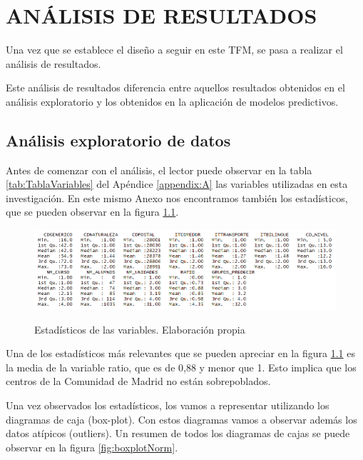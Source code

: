 \chapter{ANÁLISIS DE RESULTADOS}
Una vez que se establece el diseño a seguir en este TFM, se pasa a realizar el análisis de resultados.

Este análisis de resultados diferencia entre aquellos resultados obtenidos en el análisis exploratorio y los obtenidos en la aplicación de modelos predictivos.

\section{Análisis exploratorio de datos}

Antes de comenzar con el análisis, el lector puede observar en la tabla \ref{tab:TablaVariables} del Apéndice \ref{appendix:A} las variables utilizadas en esta investigación. En este mismo Anexo nos encontramos también los estadísticos, que se pueden observar en la figura \ref{fig:estadisticos}.

\begin{figure}[htb]
	\centering
	\caption{Estadísticos de las variables. Elaboración propia}
	\includegraphics[width=1\textwidth]{recursos/ImagenesR/estadisticos}
	\label{fig:estadisticos}
\end{figure}
\FloatBarrier

Una de los estadísticos más relevantes que se pueden apreciar en la figura \ref{fig:estadisticos} es la media de la variable ratio, que es de 0,88 y menor que 1. Esto implica que los centros de la Comunidad de Madrid no están sobrepoblados.

Una vez observados los estadísticos, los vamos a representar utilizando los diagramas de caja (box-plot). Con estos diagramas vamos a observar además los datos atípicos (outliers). Un resumen de todos los diagramas de cajas se puede observar en la figura \ref{fig:boxplotNorm}.

